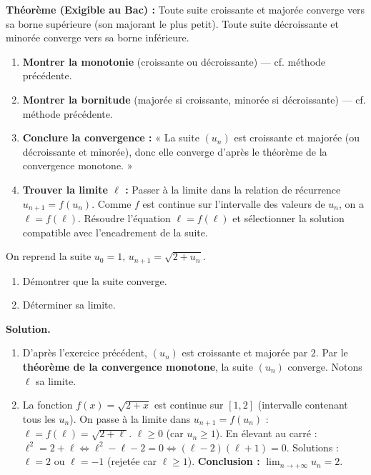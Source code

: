 \documentclass[11pt]{article}
\begin{document}
\begin{methode}
\textbf{Théorème (Exigible au Bac) :} Toute suite croissante et majorée converge vers sa borne supérieure (son majorant le plus petit). Toute suite décroissante et minorée converge vers sa borne inférieure.
\begin{enumerate}
    \item \textbf{Montrer la monotonie} (croissante ou décroissante) — cf. méthode précédente.
    \item \textbf{Montrer la bornitude} (majorée si croissante, minorée si décroissante) — cf. méthode précédente.
    \item \textbf{Conclure la convergence :} « La suite $(u_n)$ est croissante et majorée (ou décroissante et minorée), donc elle converge d'après le théorème de la convergence monotone. »
    \item \textbf{Trouver la limite $\ell$ :} Passer à la limite dans la relation de récurrence $u_{n+1} = f(u_n)$.
        Comme $f$ est continue sur l'intervalle des valeurs de $u_n$, on a $\ell = f(\ell)$.
        Résoudre l'équation $\ell = f(\ell)$ et sélectionner la solution compatible avec l'encadrement de la suite.
\end{enumerate}
\end{methode}

\begin{exoresolu}
On reprend la suite $u_0=1$, $u_{n+1}=\sqrt{2+u_n}$.
\begin{enumerate}
    \item Démontrer que la suite converge.
    \item Déterminer sa limite.
\end{enumerate}
\tcblower
\textbf{Solution.}
\begin{enumerate}
    \item D'après l'exercice précédent, $(u_n)$ est croissante et majorée par $2$.
    Par le \textbf{théorème de la convergence monotone}, la suite $(u_n)$ converge. Notons $\ell$ sa limite.
    \item La fonction $f(x) = \sqrt{2+x}$ est continue sur $[1, 2]$ (intervalle contenant tous les $u_n$).
    On passe à la limite dans $u_{n+1} = f(u_n)$ :
    $\ell = f(\ell) = \sqrt{2+\ell}$.
    $\ell \ge 0$ (car $u_n \ge 1$). En élevant au carré : $\ell^2 = 2 + \ell \iff \ell^2 - \ell - 2 = 0 \iff (\ell-2)(\ell+1)=0$.
    Solutions : $\ell = 2$ ou $\ell = -1$ (rejetée car $\ell \ge 1$).
    \textbf{Conclusion :} $\lim_{n\to+\infty} u_n = 2$.
\end{enumerate}
\end{exoresolu}
\end{document}
